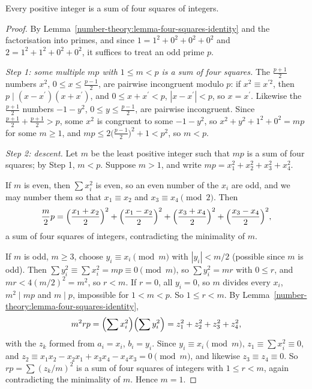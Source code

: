 \begin{theorem}[Lagrange]\label{number-theory:theorem-four-squares}
Every positive integer is a sum of four squares of integers.
\end{theorem}

\begin{proof}
By Lemma~\ref{number-theory:lemma-four-squares-identity} and the factorisation into primes, and since $1 = 1^2 + 0^2 + 0^2 + 0^2$ and $2 = 1^2 + 1^2 + 0^2 + 0^2$, it suffices to treat an odd prime $p$.

\emph{Step 1: some multiple $mp$ with $1 \leq m < p$ is a sum of four squares.} The $\frac{p+1}{2}$ numbers $x^2$, $0 \leq x \leq \frac{p-1}{2}$, are pairwise incongruent modulo $p$: if
$x^2 \equiv x^{\prime2}$, then $p \mid (x - x^{\prime})(x + x^{\prime})$, and $0 \leq x + x^{\prime} < p$, $|x - x^{\prime}| < p$, so $x = x^{\prime}$. Likewise the $\frac{p+1}{2}$ numbers $-1 - y^2$,
$0 \leq y \leq \frac{p-1}{2}$, are pairwise incongruent. Since $\frac{p+1}{2} + \frac{p+1}{2} > p$, some $x^2$ is congruent to some $-1 - y^2$, so $x^2 + y^2 + 1^2 + 0^2 = mp$ for some $m \geq 1$, and
$mp \leq 2\bigl(\frac{p-1}{2}\bigr)^2 + 1 < p^2$, so $m < p$.

\emph{Step 2: descent.} Let $m$ be the least positive integer such that $mp$ is a sum of four squares; by Step 1, $m < p$. Suppose $m > 1$, and write $mp = x_1^2 + x_2^2 + x_3^2 + x_4^2$.

If $m$ is even, then $\sum x_i^2$ is even, so an even number of the $x_i$ are odd, and we may number them so that $x_1 \equiv x_2$ and $x_3 \equiv x_4 \pmod 2$. Then
\[
\frac{m}{2}p = \Bigl(\frac{x_1 + x_2}{2}\Bigr)^2 + \Bigl(\frac{x_1 - x_2}{2}\Bigr)^2 + \Bigl(\frac{x_3 + x_4}{2}\Bigr)^2 + \Bigl(\frac{x_3 - x_4}{2}\Bigr)^2,
\]
a sum of four squares of integers, contradicting the minimality of $m$.

If $m$ is odd, $m \geq 3$, choose $y_i \equiv x_i \pmod m$ with $|y_i| < m/2$ (possible since $m$ is odd). Then $\sum y_i^2 \equiv \sum x_i^2 = mp \equiv 0 \pmod m$, so $\sum y_i^2 = mr$ with
$0 \leq r$, and $mr < 4(m/2)^2 = m^2$, so $r < m$. If $r = 0$, all $y_i = 0$, so $m$ divides every $x_i$, $m^2 \mid mp$ and $m \mid p$, impossible for $1 < m < p$. So $1 \leq r < m$. By
Lemma~\ref{number-theory:lemma-four-squares-identity},
\[
m^2rp = \Bigl(\sum x_i^2\Bigr)\Bigl(\sum y_i^2\Bigr) = z_1^2 + z_2^2 + z_3^2 + z_4^2,
\]
with the $z_k$ formed from $a_i = x_i$, $b_i = y_i$. Since $y_i \equiv x_i \pmod m$, $z_1 \equiv \sum x_i^2 \equiv 0$, and $z_2 \equiv x_1x_2 - x_2x_1 + x_3x_4 - x_4x_3 = 0 \pmod m$, and likewise
$z_3 \equiv z_4 \equiv 0$. So $rp = \sum(z_k/m)^2$ is a sum of four squares of integers with $1 \leq r < m$, again contradicting the minimality of $m$. Hence $m = 1$.
\end{proof}

